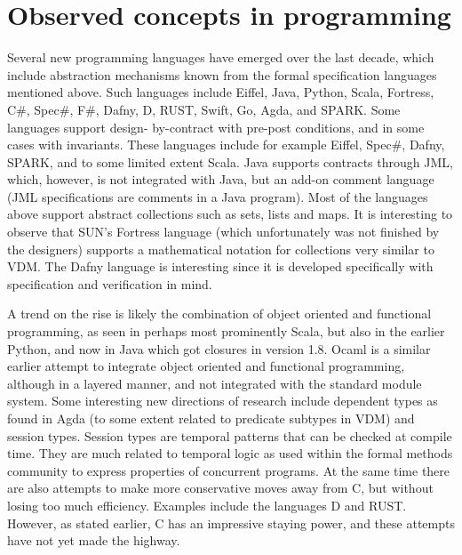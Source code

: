 
\section{Observed concepts in programming}

Several new programming languages have emerged over the last 
decade, which include abstraction mechanisms known from the formal 
specification languages mentioned above. Such languages include 
Eiffel, Java, Python, Scala, Fortress,  C\#, Spec\#, F\#,  Dafny, D, 
RUST, Swift, Go, Agda, and SPARK.  Some languages support design-
by-contract with pre-post conditions, and in some cases with 
invariants. These languages  include for example Eiffel, Spec\#, 
Dafny, SPARK, and to some limited extent Scala. Java supports 
contracts through JML, which, however, is not integrated with Java, 
but an add-on comment language (JML specifications are comments in 
a Java program). Most of the languages above support abstract 
collections such as sets, lists and maps. It is interesting to 
observe that SUN’s Fortress language (which unfortunately was not 
finished by the designers) supports a mathematical notation for 
collections very similar to VDM. The Dafny language is interesting 
since it is developed specifically with specification and 
verification in mind.

A trend on the rise is likely the combination of object oriented 
and functional programming, as seen in perhaps most prominently 
Scala, but also in the earlier Python, and now in Java which got 
closures in version 1.8.  Ocaml is a similar earlier attempt to 
integrate object oriented and functional programming, although in a 
layered manner, and not integrated with the standard module system. 
Some interesting new directions of research include dependent types 
as found in Agda (to some extent related to predicate subtypes in 
VDM) and session types. Session types are temporal patterns that 
can be checked at compile time. They are much related to temporal 
logic as used within the formal methods community to express 
properties of concurrent programs. At the same time there are also 
attempts to make more conservative moves away from C, but without 
losing too much efficiency. Examples include the languages D and 
RUST. However, as stated earlier, C has an impressive staying power, and these attempts have not yet made the highway.

